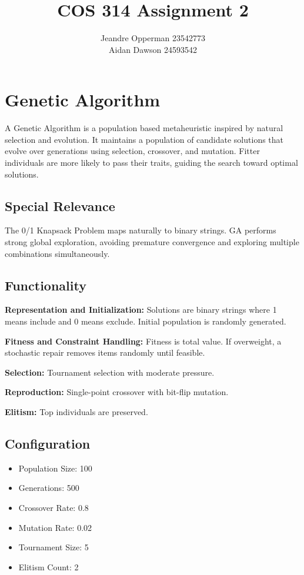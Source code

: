 \documentclass[12pt]{article}
\title{COS 314 Assignment 2}
\author{
Jeandre Opperman 23542773 \\
Aidan Dawson 24593542
}
\date{}
\begin{document}
\maketitle

\section{Genetic Algorithm}

A Genetic Algorithm is a population based metaheuristic inspired by natural selection and evolution. It maintains a population of candidate solutions that evolve over generations using selection, crossover, and mutation. Fitter individuals are more likely to pass their traits, guiding the search toward optimal solutions.

\subsection{Special Relevance}

The 0/1 Knapsack Problem maps naturally to binary strings. GA performs strong global exploration, avoiding premature convergence and exploring multiple combinations simultaneously.

\subsection{Functionality}

\textbf{Representation and Initialization:}  
Solutions are binary strings where 1 means include and 0 means exclude. Initial population is randomly generated.

\textbf{Fitness and Constraint Handling:}  
Fitness is total value. If overweight, a stochastic repair removes items randomly until feasible.

\textbf{Selection:}  
Tournament selection with moderate pressure.

\textbf{Reproduction:}  
Single-point crossover with bit-flip mutation.

\textbf{Elitism:}  
Top individuals are preserved.

\subsection{Configuration}

\begin{itemize}
\item Population Size: 100
\item Generations: 500
\item Crossover Rate: 0.8
\item Mutation Rate: 0.02
\item Tournament Size: 5
\item Elitism Count: 2
\end{itemize}
\end{document}

